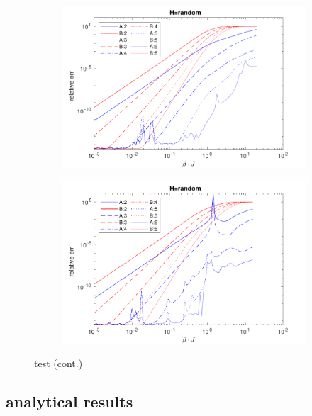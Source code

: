 \begin{figure}[H]\ContinuedFloat
    \begin{subfigure}[]{\textwidth}
        \includegraphics[width=\textwidth]{Figuren/benchmarking/random_copmAB6_3.pdf}
    \end{subfigure}

    \begin{subfigure}[]{\textwidth}
        \includegraphics[width=\textwidth]{Figuren/benchmarking/random_copmAB6_4.pdf}
    \end{subfigure}
    \caption{test (cont.) }
    \label{fig:benchmark:Random}
\end{figure}


\subsection{analytical results}
